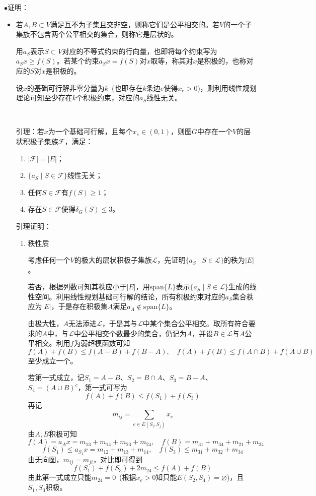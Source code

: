 \documentclass[a4paper,UTF8,fontset=windows]{ctexart}
\newcommand{\proo}[1]{{\kaishu $\bullet$证明：
\begin{itemize}
    \item[] #1
\end{itemize}
}}
\begin{document}
\proo{
    若$A,B\subset V$满足互不为子集且交非空，则称它们是公平相交的。若$V$的一个子集族不包含两个公平相交的集合，则称它是层状的。

    用$a_S$表示$S\subset V$对应的不等式约束的行向量，也即将每个约束写为$a_Sx\ge f(S)$。若某个约束$a_Sx=f(S)$对$x$取等，称其对$x$是积极的，也称对应的$S$对$x$是积极的。

    设$x$的基础可行解非零分量为$k$\ (也即存在$k$条边$e$使得$x_e>0$)，则利用线性规划理论可知至少存在$k$个积极约束，对应的$a_S$线性无关。

    \

    引理：若$x$为一个基础可行解，且每个$x_e\in(0,1)$，则图$G$中存在一个$V$的层状积极子集族$\mathcal{F}$，满足：
    \begin{enumerate}
        \item $|\mathcal{F}|=|E|$；
        \item $\{a_S\mid S\in\mathcal{F}\}$线性无关；
        \item 任何$S\in\mathcal{F}$有$f(S)\ge1$；
        \item 存在$S\in\mathcal{F}$使得$\delta_G(S)\le3$。
    \end{enumerate}

    引理证明：
    \begin{enumerate}
        \item 秩性质
        
        考虑任何一个$V$的极大的层状积极子集族$\mathcal{L}$，先证明$\{a_S\mid S\in\mathcal{L}\}$的秩为$|E|$。

        若否，根据列数可知其秩应小于$|E|$，用$\mathrm{span}\{L\}$表示$\{a_S\mid S\in\mathcal{L}\}$生成的线性空间。利用线性规划基础可行解的结论，所有积极约束对应的$a_S$集合秩应为$|E|$，于是存在积极集$A$满足$a_A\notin\mathrm{span}\{L\}$。

        由极大性，$A$无法添进$\mathcal{L}$，于是其与$\mathcal{L}$中某个集合公平相交。取所有符合要求的$A$中，与$\mathcal{L}$中公平相交个数最少的集合，仍记为$A$，并设$B\in\mathcal{L}$与$A$公平相交。利用$f$为弱超模函数可知
        $$f(A)+f(B)\le f(A-B)+f(B-A),\quad f(A)+f(B)\le f(A\cap B)+f(A\cup B)$$
        至少成立一个。

        若第一式成立，记$S_1=A-B$、$S_2=B\cap A$、$S_3=B-A$、$S_4=(A\cup B)^c$，第一式可写为
        $$f(A)+f(B)\le f(S_1)+f(S_3)$$
        再记
        $$m_{ij}=\sum_{e\in E(S_i,S_j)}x_e$$
        由$A,B$积极可知
        $$f(A)=a_Ax=m_{13}+m_{14}+m_{23}+m_{24},\quad f(B)=m_{31}+m_{34}+m_{21}+m_{24}$$
        $$f(S_1)\le a_{S_1}x=m_{12}+m_{13}+m_{14},\quad f(S_3)\le m_{31}+m_{32}+m_{34}$$
        由无向图，$m_{ij}=m_{ji}$，对比即可得到
        $$f(S_1)+f(S_3)+2m_{24}\le f(A)+f(B)$$
        由此第一式成立只能$m_{24}=0$\ (根据$x_e>0$知只能$E(S_2,S_4)=\varnothing$)，且$S_1,S_3$积极。


\end{enumerate}}
\end{document}
